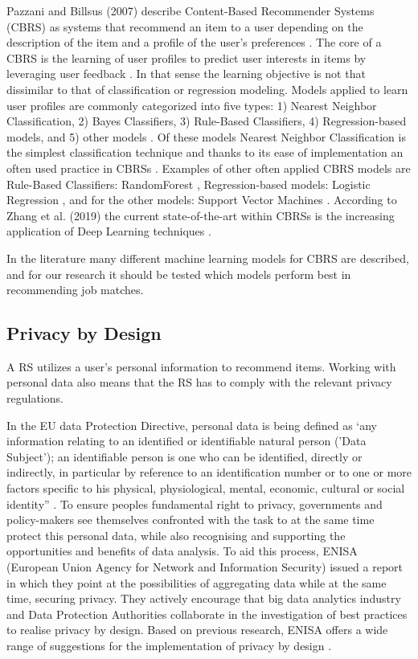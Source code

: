 Pazzani and Billsus (2007) describe Content-Based Recommender Systems (CBRS) as systems that recommend an item to a user depending on the description of the item and a profile of the user’s preferences \cite{pazzani2007content}.
The core of a CBRS is the learning of user profiles to predict user interests in items by leveraging user feedback \cite{aggarwal2016content}.
In that sense the learning objective is not that dissimilar to that of classification or regression modeling.
Models applied to learn user profiles are commonly categorized into five types: 1) Nearest Neighbor Classification, 2) Bayes Classifiers, 3) Rule-Based Classifiers, 4) Regression-based models, and 5) other models \cite{aggarwal2016content, pazzani2007content}.
Of these models Nearest Neighbor Classification is the simplest classification technique and thanks to its ease of implementation an often used practice in CBRSs \cite{balabanovic1997fab}.
Examples of other often applied CBRS models  are Rule-Based Classifiers: RandomForest  \cite{zhang2016three, breiman2001random}, Regression-based models: Logistic Regression \cite{aggarwal2016content, hosmer2013applied}, and for the other models: Support Vector Machines \cite{aggarwal2016content, burges1998tutorial}.
According to Zhang et al. (2019) the current state-of-the-art within CBRSs is the increasing application of Deep Learning techniques \cite{zhang2019deep}.

In the literature many different machine learning models for CBRS are described, and for our research it should be tested which models perform best in recommending job matches.


\subsection{Privacy by Design}
\label{sec:pbd}
A RS utilizes a user’s personal information to recommend items.
Working with personal data also means that the RS has to comply with the relevant privacy regulations.

In the EU data Protection Directive, personal data is being defined as ‘any information relating to an identified or identifiable natural person ('Data Subject'); an identifiable person is one who can be identified, directly or indirectly, in particular by reference to an identification number or to one or more factors specific to his physical, physiological, mental, economic, cultural or social identity” \cite{european_data_protection}. 
To ensure peoples fundamental right to privacy, governments and policy-makers see themselves confronted with the task to at the same time protect this personal data, while also recognising and supporting the opportunities and benefits of data analysis.
To aid this process, ENISA (European Union Agency for Network and Information Security) issued a report in which they point at the possibilities of aggregating data while at the same time, securing privacy. 
They actively encourage that big data analytics industry and Data Protection Authorities collaborate in the investigation of best practices to realise privacy by design. 
Based on previous research, ENISA offers a wide range of suggestions for the implementation of privacy by design \cite{d2015privacy}.

